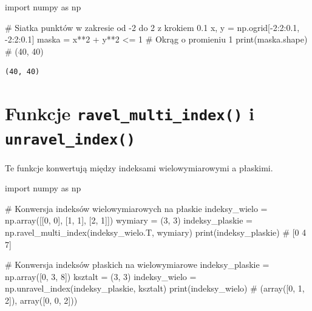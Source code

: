\documentclass[
  letterpaper,
  DIV=11,
  numbers=noendperiod]{scrreprt}
\newenvironment{Shaded}{\begin{snugshade}}{\end{snugshade}}
\newcommand{\BuiltInTok}[1]{\textcolor[rgb]{0.00,0.23,0.31}{#1}}
\newcommand{\CommentTok}[1]{\textcolor[rgb]{0.37,0.37,0.37}{#1}}
\newcommand{\DecValTok}[1]{\textcolor[rgb]{0.68,0.00,0.00}{#1}}
\newcommand{\FloatTok}[1]{\textcolor[rgb]{0.68,0.00,0.00}{#1}}
\newcommand{\ImportTok}[1]{\textcolor[rgb]{0.00,0.46,0.62}{#1}}
\newcommand{\NormalTok}[1]{\textcolor[rgb]{0.00,0.23,0.31}{#1}}
\newcommand{\OperatorTok}[1]{\textcolor[rgb]{0.37,0.37,0.37}{#1}}
\begin{document}
\begin{Shaded}
\begin{Highlighting}[]
\ImportTok{import}\NormalTok{ numpy }\ImportTok{as}\NormalTok{ np}

\CommentTok{\# Siatka punktów w zakresie od {-}2 do 2 z krokiem 0.1}
\NormalTok{x, y }\OperatorTok{=}\NormalTok{ np.ogrid[}\OperatorTok{{-}}\DecValTok{2}\NormalTok{:}\DecValTok{2}\NormalTok{:}\FloatTok{0.1}\NormalTok{, }\OperatorTok{{-}}\DecValTok{2}\NormalTok{:}\DecValTok{2}\NormalTok{:}\FloatTok{0.1}\NormalTok{]}
\NormalTok{maska }\OperatorTok{=}\NormalTok{ x}\OperatorTok{**}\DecValTok{2} \OperatorTok{+}\NormalTok{ y}\OperatorTok{**}\DecValTok{2} \OperatorTok{\textless{}=} \DecValTok{1}  \CommentTok{\# Okrąg o promieniu 1}
\BuiltInTok{print}\NormalTok{(maska.shape)  }\CommentTok{\# (40, 40)}
\end{Highlighting}
\end{Shaded}

\begin{verbatim}
(40, 40)
\end{verbatim}

\section{\texorpdfstring{Funkcje \texttt{ravel\_multi\_index()} i
\texttt{unravel\_index()}}{Funkcje ravel\_multi\_index() i unravel\_index()}}\label{funkcje-ravel_multi_index-i-unravel_index}

Te funkcje konwertują między indeksami wielowymiarowymi a płaskimi.

\begin{Shaded}
\begin{Highlighting}[]
\ImportTok{import}\NormalTok{ numpy }\ImportTok{as}\NormalTok{ np}

\CommentTok{\# Konwersja indeksów wielowymiarowych na płaskie}
\NormalTok{indeksy\_wielo }\OperatorTok{=}\NormalTok{ np.array([[}\DecValTok{0}\NormalTok{, }\DecValTok{0}\NormalTok{], [}\DecValTok{1}\NormalTok{, }\DecValTok{1}\NormalTok{], [}\DecValTok{2}\NormalTok{, }\DecValTok{1}\NormalTok{]])}
\NormalTok{wymiary }\OperatorTok{=}\NormalTok{ (}\DecValTok{3}\NormalTok{, }\DecValTok{3}\NormalTok{)}
\NormalTok{indeksy\_plaskie }\OperatorTok{=}\NormalTok{ np.ravel\_multi\_index(indeksy\_wielo.T, wymiary)}
\BuiltInTok{print}\NormalTok{(indeksy\_plaskie)  }\CommentTok{\# [0 4 7]}

\CommentTok{\# Konwersja indeksów płaskich na wielowymiarowe}
\NormalTok{indeksy\_plaskie }\OperatorTok{=}\NormalTok{ np.array([}\DecValTok{0}\NormalTok{, }\DecValTok{3}\NormalTok{, }\DecValTok{8}\NormalTok{])}
\NormalTok{ksztalt }\OperatorTok{=}\NormalTok{ (}\DecValTok{3}\NormalTok{, }\DecValTok{3}\NormalTok{)}
\NormalTok{indeksy\_wielo }\OperatorTok{=}\NormalTok{ np.unravel\_index(indeksy\_plaskie, ksztalt)}
\BuiltInTok{print}\NormalTok{(indeksy\_wielo)  }\CommentTok{\# (array([0, 1, 2]), array([0, 0, 2]))}
\end{Highlighting}
\end{Shaded}
\end{document}
